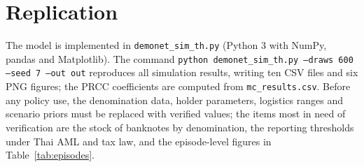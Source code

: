 \documentclass[11pt]{article}
\theoremstyle{definition}
\theoremstyle{remark}
\begin{document}
\section{Replication}\label{app:repl}
The model is implemented in \texttt{demonet\_sim\_th.py} (Python 3 with NumPy, pandas and Matplotlib). The command
\texttt{python demonet\_sim\_th.py --draws 600 --seed 7 --out out} reproduces all simulation results, writing ten CSV files
and six PNG figures; the PRCC coefficients are computed from \texttt{mc\_results.csv}. Before any policy use, the
denomination data, holder parameters, logistics ranges and scenario priors must be replaced with verified values; the
items most in need of verification are the stock of banknotes by denomination, the reporting thresholds under Thai AML
and tax law, and the episode-level figures in Table~\ref{tab:episodes}.
\end{document}
